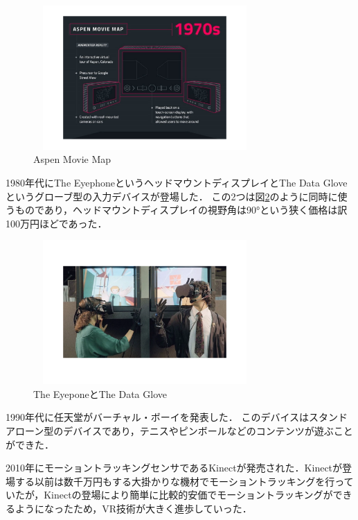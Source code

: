 \documentclass[12pt,a4j]{ltjsarticle}
\begin{document}
\begin{figure}[h]
\begin{center}
 \includegraphics[clip,width=85mm,height=55mm]{Aspen_Movie_Map.pdf}
\end{center}
 \caption{Aspen Movie Map}
 \label{fig:Aspen_Movie_Map.pdf}
\end{figure}

1980年代にThe EyephoneというヘッドマウントディスプレイとThe Data Gloveというグローブ型の入力デバイスが登場した．
この2つは図\ref{fig:The_Eyephone.pdf}のように同時に使うものであり，ヘッドマウントディスプレイの視野角は90°という狭く価格は訳100万円ほどであった\cite{VRの機材}．

\begin{figure}[h]
\begin{center}
 \includegraphics[clip,width=85mm,height=55mm]{The_Eyephone.pdf}
\end{center}
 \caption{The EyeponeとThe Data Glove}
 \label{fig:The_Eyephone.pdf}
\end{figure}

1990年代に任天堂がバーチャル・ボーイを発表した．
このデバイスはスタンドアローン型のデバイスであり，テニスやピンボールなどのコンテンツが遊ぶことができた\cite{VRの機材}．

2010年にモーショントラッキングセンサであるKinectが発売された．Kinectが登場する以前は数千万円もする大掛かりな機材でモーショントラッキングを行っていたが，Kinectの登場により簡単に比較的安価でモーショントラッキングができるようになったため，VR技術が大きく進歩していった\cite{VRの機材}．
\end{document}
